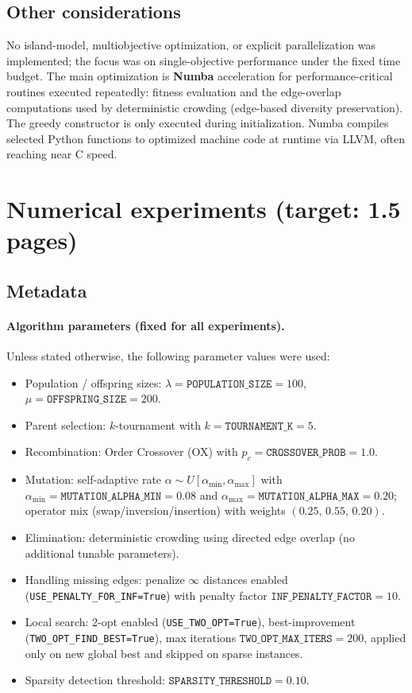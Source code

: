\documentclass[a4paper,10pt]{article}
\begin{document}
\subsection{Other considerations}\label{sec_oth}

No island-model, multiobjective optimization, or explicit parallelization was implemented; the focus was on
single-objective performance under the fixed time budget. The main optimization is \textbf{Numba} acceleration
for performance-critical routines executed repeatedly: fitness evaluation and the edge-overlap computations used
by deterministic crowding (edge-based diversity preservation). The greedy constructor is only executed during
initialization. Numba compiles selected Python functions to optimized machine code at runtime via LLVM, often
reaching near C speed.

\section{Numerical experiments \hfill(target: 1.5 pages)}

\subsection{Metadata}

\paragraph{Algorithm parameters (fixed for all experiments).}
Unless stated otherwise, the following parameter values were used:
\begin{itemize}
	\item Population / offspring sizes: $\lambda=\texttt{POPULATION\_SIZE}=100$, $\mu=\texttt{OFFSPRING\_SIZE}=200$.
	\item Parent selection: $k$-tournament with $k=\texttt{TOURNAMENT\_K}=5$.
	\item Recombination: Order Crossover (OX) with $p_c=\texttt{CROSSOVER\_PROB}=1.0$.
	\item Mutation: self-adaptive rate $\alpha \sim U[\alpha_{\min},\alpha_{\max}]$ with
	$\alpha_{\min}=\texttt{MUTATION\_ALPHA\_MIN}=0.08$ and $\alpha_{\max}=\texttt{MUTATION\_ALPHA\_MAX}=0.20$;
	operator mix (swap/inversion/insertion) with weights $(0.25,\,0.55,\,0.20)$.
	\item Elimination: deterministic crowding using directed edge overlap (no additional tunable parameters).
	\item Handling missing edges: penalize $\infty$ distances enabled (\texttt{USE\_PENALTY\_FOR\_INF=True}) with
	penalty factor $\texttt{INF\_PENALTY\_FACTOR}=10$.
	\item Local search: 2-opt enabled (\texttt{USE\_TWO\_OPT=True}), best-improvement
	(\texttt{TWO\_OPT\_FIND\_BEST=True}), max iterations $\texttt{TWO\_OPT\_MAX\_ITERS}=200$, applied only on new
	global best and skipped on sparse instances.
	\item Sparsity detection threshold: $\texttt{SPARSITY\_THRESHOLD}=0.10$.
\end{itemize}
\end{document}
